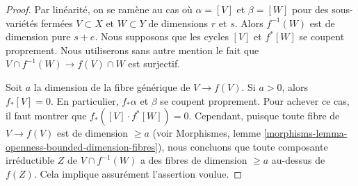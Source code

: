 \begin{proof}
Par linéarité, on se ramène au cas où $\alpha = [V]$ et
$\beta = [W]$ pour des sous-variétés fermées $V \subset X$ et
$W \subset Y$ de dimensions $r$ et $s$. Alors $f^{-1}(W)$ est de
dimension pure $s + e$. Nous supposons que les cycles
$[V]$ et $f^*[W]$ se coupent proprement. Nous utiliserons sans
autre mention le fait que $V \cap f^{-1}(W) \to f(V) \cap W$
est surjectif.

\medskip\noindent
Soit $a$ la dimension de la fibre générique de $V \to f(V)$.
Si $a > 0$, alors $f_*[V] = 0$. En particulier, $f_*\alpha$ et $\beta$
se coupent proprement. Pour achever ce cas, il faut montrer que
$f_*([V] \cdot f^*[W]) = 0$. Cependant, puisque toute fibre de
$V \to f(V)$ est de dimension $\geq a$ (voir
Morphismes, lemme \ref{morphisms-lemma-openness-bounded-dimension-fibres}),
nous concluons que toute composante irréductible $Z$ de $V \cap f^{-1}(W)$
a des fibres de dimension $\geq a$ au-dessus de $f(Z)$. Cela implique
assurément l'assertion voulue.


\end{proof}
